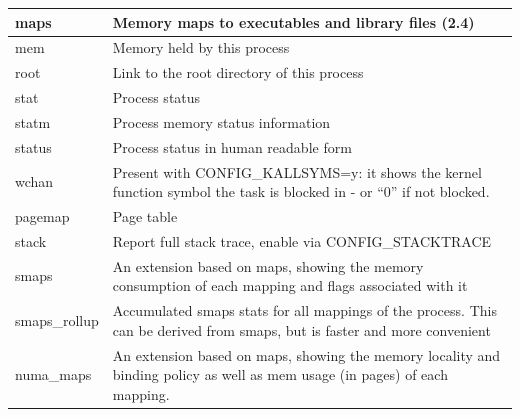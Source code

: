 \documentclass{beamer}
\begin{document}
\begin{frame}
\begin{footnotesize}
\begin{tiny}
\begin{table}[h!]
\begin{tabular}{|p{1.5cm}|p{9cm}|}
                        \hline
                        maps          & Memory maps to executables and library files (2.4)                                                                          \\
                        \hline
                        mem           & Memory held by this process                                                                                                 \\
                        \hline
                        root          & Link to the root directory of this process                                                                                  \\
                        \hline
                        stat          & Process status                                                                                                              \\
                        \hline
                        statm         & Process memory status information                                                                                           \\
                        \hline
                        status        & Process status in human readable form                                                                                       \\
                        \hline
                        wchan         & Present with CONFIG\_KALLSYMS=y: it shows the kernel function symbol the task is blocked in - or “0” if not blocked.        \\
                        \hline
                        pagemap       & Page table                                                                                                                  \\
                        \hline
                        stack         & Report full stack trace, enable via CONFIG\_STACKTRACE                                                                      \\
                        \hline
                        smaps         & An extension based on maps, showing the memory consumption of each mapping and flags associated with it                     \\
                        \hline
                        smaps\_rollup & Accumulated smaps stats for all mappings of the process. This can be derived from smaps, but is faster and more convenient  \\
                        \hline
                        numa\_maps    & An extension based on maps, showing the memory locality and binding policy as well as mem usage (in pages) of each mapping. \\
                        \hline
                    \end{tabular}
                \end{table}
            \end{tiny}
        \end{footnotesize}
    \end{frame}
\end{document}

